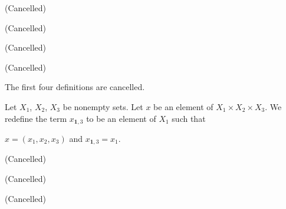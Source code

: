 \documentclass{article}
\begin{document}
\begin{thm}
\item\label{mcart1:25} (Cancelled)
\item\label{mcart1:26} 
\item\label{mcart1:27} (Cancelled)
\item\label{mcart1:28} (Cancelled)
\item\label{mcart1:29} (Cancelled)
\item\label{mcart1:30} 
\item\label{mcart1:31} 
\item\label{mcart1:32} 
\item\label{mcart1:33} 
\item\label{mcart1:34} 
\item\label{mcart1:35} 
\item\label{mcart1:36} 
\item\label{mcart1:37} 
\item\label{mcart1:38} 
\item\label{mcart1:39} 
\item\label{mcart1:40} 
\item\label{mcart1:41} 
\item\label{mcart1:42} 
\end{thm}

The first four definitions are cancelled.

\begin{definition}
  Let $X_{1}$, $X_{2}$, $X_{3}$ be nonempty sets.
  Let $x$ be an element of $X_{1}\times X_{2}\times X_{3}$.
  We redefine the term $x_{\mathbf{1},3}$ to be an element of
  $X_{1}$ such that
  \begin{defn}[start=5]
  \item $x=(x_{1},x_{2},x_{3})$ and $x_{\mathbf{1},3}=x_{1}$.
  \end{defn}
\end{definition}

\begin{thm}
\item\label{mcart1:43} (Cancelled)
\item\label{mcart1:44} (Cancelled)
\item\label{mcart1:45} 
\item\label{mcart1:46} (Cancelled)
\item\label{mcart1:47} 
\item\label{mcart1:48} 
\end{thm}
\end{document}
